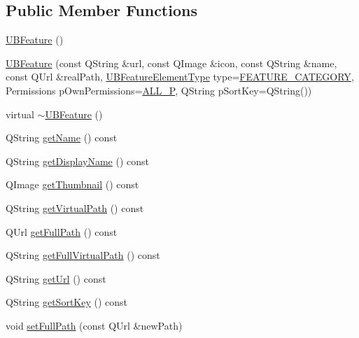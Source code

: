 \subsection*{Public Member Functions}
\begin{DoxyCompactItemize}
\item 
\hyperlink{class_u_b_feature_a682c9c052b281fc7fcfb9efe075400b1}{U\-B\-Feature} ()
\item 
\hyperlink{class_u_b_feature_ae1a5e0aea0b2da3a0f7102bc0a78e1e5}{U\-B\-Feature} (const Q\-String \&url, const Q\-Image \&icon, const Q\-String \&name, const Q\-Url \&real\-Path, \hyperlink{_u_b_features_controller_8h_a1ae525bf6101c0de35195259d4a6674f}{U\-B\-Feature\-Element\-Type} type=\hyperlink{_u_b_features_controller_8h_a1ae525bf6101c0de35195259d4a6674fa7fa1d12d7a118a844d5994b5052bc040}{F\-E\-A\-T\-U\-R\-E\-\_\-\-C\-A\-T\-E\-G\-O\-R\-Y}, Permissions p\-Own\-Permissions=\hyperlink{class_u_b_feature_a7fb84a230f92260b4a29261329ad4180ac5b053fe5b2b8f899db8524645ee8fa7}{A\-L\-L\-\_\-\-P}, Q\-String p\-Sort\-Key=Q\-String())
\item 
virtual \hyperlink{class_u_b_feature_a13e63ae94c0921261b39aeb13f22859f}{$\sim$\-U\-B\-Feature} ()
\item 
Q\-String \hyperlink{class_u_b_feature_a5f863075343c08c09bd45c230c739ac9}{get\-Name} () const 
\item 
Q\-String \hyperlink{class_u_b_feature_a54feb7122e56b6bec4f275e9e9cb42cb}{get\-Display\-Name} () const 
\item 
Q\-Image \hyperlink{class_u_b_feature_a624b02d751fd78a6698e51d3ef645e2e}{get\-Thumbnail} () const 
\item 
Q\-String \hyperlink{class_u_b_feature_abe1b7ac8f7fe9f69c3b2a467733aaa8b}{get\-Virtual\-Path} () const 
\item 
Q\-Url \hyperlink{class_u_b_feature_a4ceaa848c777bba908e70888cc8b0008}{get\-Full\-Path} () const 
\item 
Q\-String \hyperlink{class_u_b_feature_a175da54d5e0d135c43b44009601a1380}{get\-Full\-Virtual\-Path} () const 
\item 
Q\-String \hyperlink{class_u_b_feature_a705c1814297e4afaf4bbe79ae4db76bf}{get\-Url} () const 
\item 
Q\-String \hyperlink{class_u_b_feature_a43702c0380af7fca69e91fa1123d038d}{get\-Sort\-Key} () const 
\item 
void \hyperlink{class_u_b_feature_a0eb5ba733c1e431896544808b130300f}{set\-Full\-Path} (const Q\-Url \&new\-Path)
\item 

\end{DoxyCompactItemize}
